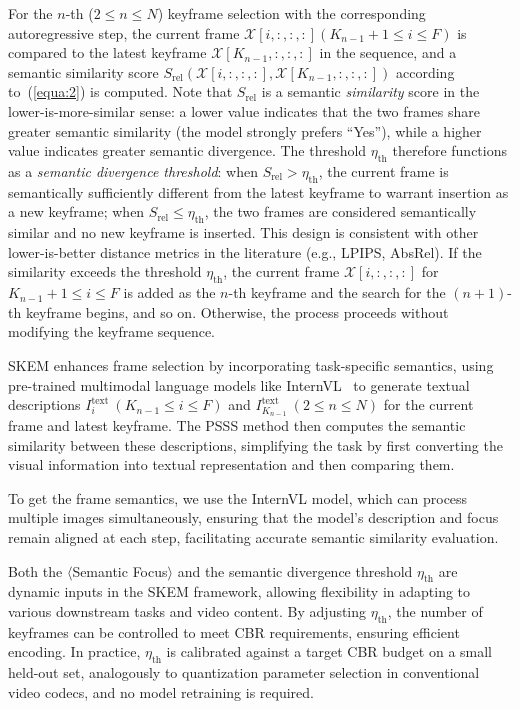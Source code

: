 \documentclass[10pt,journal]{IEEEtran}
\begin{document}
For the $n$-th ($2 \leq n \leq N$) keyframe selection with the corresponding autoregressive step, the current frame $\mathcal{X}\left[i,:,:,:\right] (K_{n-1}+1 \leq i \leq F)$ is compared to the latest keyframe $\mathcal{X}\left[K_{n-1},:,:,:\right]$ in the sequence, and a semantic similarity score $S_\mathrm{rel}(\mathcal{X}\left[i,:,:,:\right], \mathcal{X}\left[K_{n-1},:,:,:\right])$ according to~(\ref{equa:2}) is computed. Note that $S_\mathrm{rel}$ is a semantic \emph{similarity} score in the lower-is-more-similar sense: a lower value indicates that the two frames share greater semantic similarity (the model strongly prefers ``Yes''), while a higher value indicates greater semantic divergence. The threshold $\eta_{\text{th}}$ therefore functions as a \emph{semantic divergence threshold}: when $S_\mathrm{rel} > \eta_{\text{th}}$, the current frame is semantically sufficiently different from the latest keyframe to warrant insertion as a new keyframe; when $S_\mathrm{rel} \leq \eta_{\text{th}}$, the two frames are considered semantically similar and no new keyframe is inserted. This design is consistent with other lower-is-better distance metrics in the literature (e.g., LPIPS, AbsRel). If the similarity exceeds the threshold $\eta_{\text{th}}$, the current frame $\mathcal{X}\left[i,:,:,:\right]$ for $K_{n-1}+1 \leq i \leq F$ is added as the $n$-th keyframe and the search for the $\left(n+1\right)$-th keyframe begins, and so on. Otherwise, the process proceeds without modifying the keyframe sequence.

SKEM enhances frame selection by incorporating task-specific semantics, using pre-trained multimodal language models like InternVL~\cite{chen2024internvlscalingvisionfoundation} to generate textual descriptions $I^{\text{text}}_{i}~(K_{n-1} \leq i \leq F)$ and $I^{\text{text}}_{K_{n-1}}~(2 \leq n \leq N)$ for the current frame and latest keyframe. The PSSS method then computes the semantic similarity between these descriptions, simplifying the task by first converting the visual information into textual representation and then comparing them.

To get the frame semantics, we use the InternVL model, which can process multiple images simultaneously, ensuring that the model's description and focus remain aligned at each step, facilitating accurate semantic similarity evaluation.

Both the $\langle$Semantic Focus$\rangle$ and the semantic divergence threshold $\eta_{\text{th}}$ are dynamic inputs in the SKEM framework, allowing flexibility in adapting to various downstream tasks and video content. By adjusting $\eta_{\text{th}}$, the number of keyframes can be controlled to meet CBR requirements, ensuring efficient encoding. In practice, $\eta_{\text{th}}$ is calibrated against a target CBR budget on a small held-out set, analogously to quantization parameter selection in conventional video codecs, and no model retraining is required.
\end{document}
